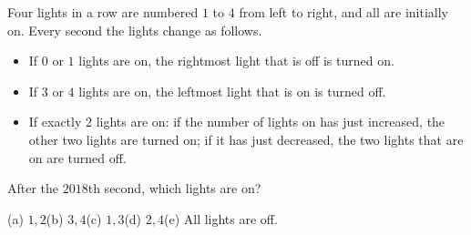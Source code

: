 Four lights in a row are numbered $1$ to $4$ from left to right, and all are initially on. Every second the lights change as follows.
\begin{itemize}
\item If $0$ or $1$ lights are on, the rightmost light that is off is turned on.
\item If $3$ or $4$ lights are on, the leftmost light that is on is turned off.
\item If exactly $2$ lights are on: if the number of lights on has just increased, the other two lights are turned on; if it has just decreased, the two lights that are on are turned off.
\end{itemize}
After the $2018$th second, which lights are on?

(a) $1,2$\quad (b) $3,4$\quad (c) $1,3$\quad (d) $2,4$\quad (e) All lights are off.
